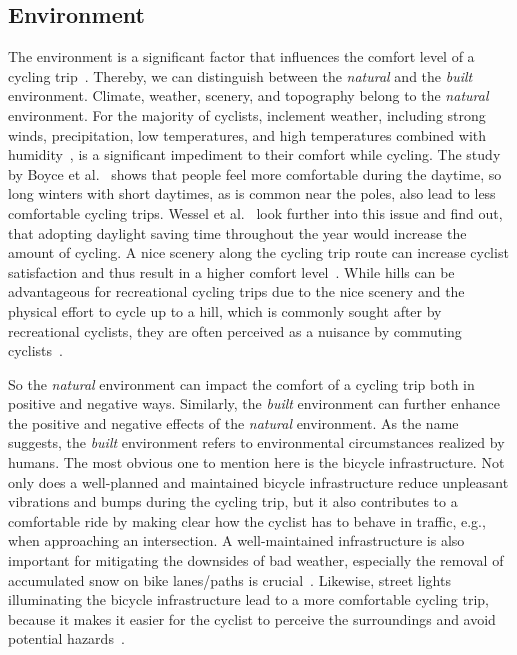 \subsection*{Environment}
The environment is a significant factor that influences the comfort level of a cycling trip~\cite{hull2014bicycle}.
Thereby, we can distinguish between the \textit{natural} and the \textit{built} environment.
Climate, weather, scenery, and topography belong to the \textit{natural} environment.
For the majority of cyclists, inclement weather, including strong winds, precipitation, low temperatures, and high temperatures combined with humidity~\cite{nkurunziza2012examining}, is a significant impediment to their comfort while cycling.
The study by Boyce et al.~\cite{boyce2000perceptions} shows that people feel more comfortable during the daytime, so long winters with short daytimes, as is common near the poles, also lead to less comfortable cycling trips.
Wessel et al.~\cite{wessel2022cycling} look further into this issue and find out, that adopting daylight saving time throughout the year would increase the amount of cycling.
A nice scenery along the cycling trip route can increase cyclist satisfaction and thus result in a higher comfort level~\cite{wahlgren2012exploring,willis2013uniquely}.
While hills can be advantageous for recreational cycling trips due to the nice scenery and the physical effort to cycle up to a hill, which is commonly sought after by recreational cyclists, they are often perceived as a nuisance by commuting cyclists~\cite{lee2008neighbourhood}.

So the \textit{natural} environment can impact the comfort of a cycling trip both in positive and negative ways.
Similarly, the \textit{built} environment can further enhance the positive and negative effects of the \textit{natural} environment.
As the name suggests, the \textit{built} environment refers to environmental circumstances realized by humans.
The most obvious one to mention here is the bicycle infrastructure.
Not only does a well-planned and maintained bicycle infrastructure reduce unpleasant vibrations and bumps during the cycling trip, but it also contributes to a comfortable ride by making clear how the cyclist has to behave in traffic, e.g., when approaching an intersection.
A well-maintained infrastructure is also important for mitigating the downsides of bad weather, especially the removal of accumulated snow on bike lanes/paths is crucial~\cite{an2019weather,shoman2023evaluation}.
Likewise, street lights illuminating the bicycle infrastructure lead to a more comfortable cycling trip, because it makes it easier for the cyclist to perceive the surroundings and avoid potential hazards~\cite{digioia2017safety}.

